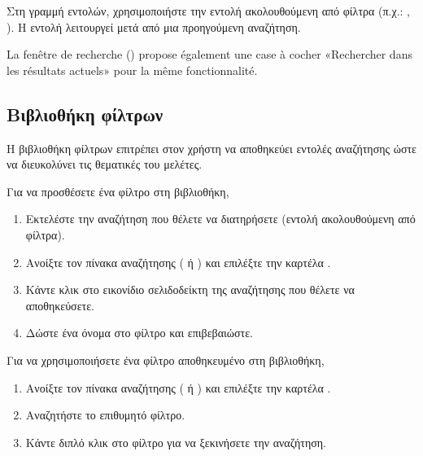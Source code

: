 \documentclass[letterpaper,10pt,greek]{sphinxmanual}
\begin{document}
\sphinxAtStartPar
Στη γραμμή εντολών, χρησιμοποιήστε την εντολή  ακολουθούμενη από φίλτρα (π.χ.: , ). Η εντολή  λειτουργεί μετά από μια προηγούμενη αναζήτηση.

\sphinxAtStartPar
La fenêtre de recherche () propose également une case à cocher
«Rechercher dans les résultats actuels» pour la même fonctionnalité.


\subsection{Βιβλιοθήκη φίλτρων}
\label{\detokenize{annexe_filtres:bibliotheque-de-filtres}}
\sphinxAtStartPar
Η βιβλιοθήκη φίλτρων επιτρέπει στον χρήστη να αποθηκεύει εντολές αναζήτησης ώστε να διευκολύνει τις θεματικές του μελέτες.

\sphinxAtStartPar
Για να προσθέσετε ένα φίλτρο στη βιβλιοθήκη,
\begin{enumerate}
%
\item {} 
\sphinxAtStartPar
Εκτελέστε την αναζήτηση που θέλετε να διατηρήσετε (εντολή  ακολουθούμενη από φίλτρα).

\item {} 
\sphinxAtStartPar
Ανοίξτε τον πίνακα αναζήτησης ( ή ) και επιλέξτε την καρτέλα .

\item {} 
\sphinxAtStartPar
Κάντε κλικ στο εικονίδιο σελιδοδείκτη της αναζήτησης που θέλετε να αποθηκεύσετε.

\item {} 
\sphinxAtStartPar
Δώστε ένα όνομα στο φίλτρο και επιβεβαιώστε.

\end{enumerate}

\sphinxAtStartPar
Για να χρησιμοποιήσετε ένα φίλτρο αποθηκευμένο στη βιβλιοθήκη,
\begin{enumerate}
%
\item {} 
\sphinxAtStartPar
Ανοίξτε τον πίνακα αναζήτησης ( ή ) και επιλέξτε την καρτέλα .

\item {} 
\sphinxAtStartPar
Αναζητήστε το επιθυμητό φίλτρο.

\item {} 
\sphinxAtStartPar
Κάντε διπλό κλικ στο φίλτρο για να ξεκινήσετε την αναζήτηση.

\end{enumerate}
\end{document}
